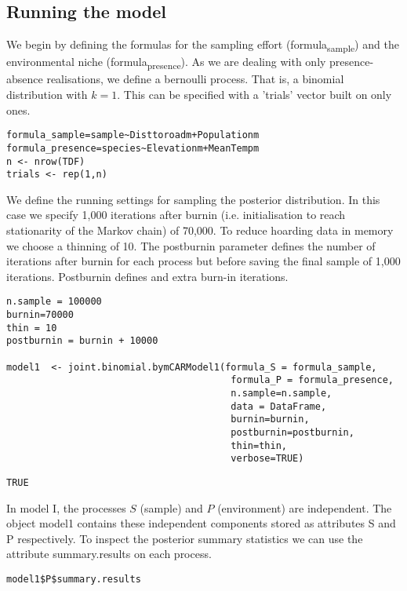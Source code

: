 \documentclass[11pt]{article}
\begin{document}
\subsection{Running the model}
\label{sec:orgd9f13f2}
We begin by defining the formulas for the sampling effort (formula\textsubscript{sample}) and the environmental niche (formula\textsubscript{presence}).
As we are dealing with only presence-absence realisations, we define a bernoulli process. That is, a binomial distribution with \(k=1\).
This can be specified with a 'trials' vector built on only ones.
\begin{verbatim}
formula_sample=sample~Disttoroadm+Populationm
formula_presence=species~Elevationm+MeanTempm
n <- nrow(TDF)
trials <- rep(1,n)
\end{verbatim}

We define the running settings for sampling the posterior distribution. In this case we specify 1,000 iterations after burnin (i.e. initialisation to reach stationarity of the Markov chain) of 70,000. To reduce hoarding data in memory we choose a thinning of 10. The postburnin parameter defines the number of iterations after burnin for each process but before saving the final sample of 1,000 iterations. Postburnin defines and extra burn-in iterations.
\begin{verbatim}
n.sample = 100000
burnin=70000
thin = 10
postburnin = burnin + 10000

model1  <- joint.binomial.bymCARModel1(formula_S = formula_sample,
                                        formula_P = formula_presence,
                                        n.sample=n.sample,
                                        data = DataFrame,
                                        burnin=burnin,
                                        postburnin=postburnin,
                                        thin=thin,
                                        verbose=TRUE)
\end{verbatim}

\begin{verbatim}
TRUE
\end{verbatim}


In model I, the processes \(S\) (sample) and \(P\) (environment) are independent. The object model1 contains these independent components stored as attributes S and P respectively. To inspect the posterior summary statistics we can use the attribute summary.results on each process.

\begin{verbatim}
model1$P$summary.results
\end{verbatim}
\end{document}
